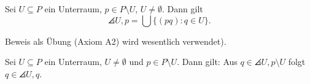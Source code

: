 \documentclass[
 a4paper,
 12pt,
 parskip=half
 ]{scrartcl}
\theoremstyle{plain}
\theoremstyle{definition}
\begin{document}
\setcounter{thm}{17}
\begin{prp}
 Sei $U \subseteq P$ ein Unterraum, $p \in P \setminus U$, $U \ne \emptyset$. Dann gilt
 \[ \angles{ U,p } = \bigcup \{ (pq) : q \in U \}. \]
\end{prp}

Beweis als Übung (Axiom A2) wird wesentlich verwendet).

\begin{prp}[Austauschsatz]
 Sei $U \subseteq P$ ein Unterraum, $U \ne \emptyset$ und $p \in P \setminus U$. Dann gilt: Aus $q \in \angles{U,p} \setminus U$ folgt $q \in \angles{U,q}$.
\end{prp}
\end{document}
